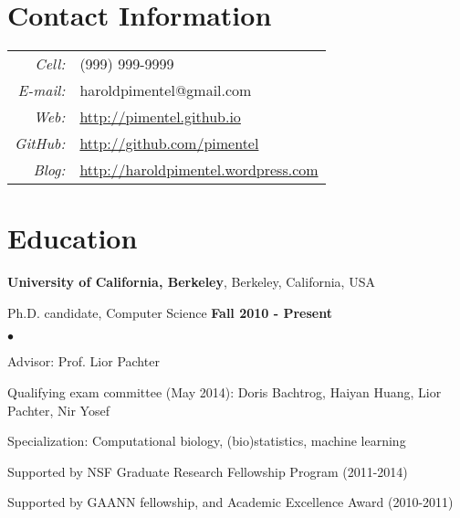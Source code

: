 \documentclass[margin,line]{res}
\newenvironment{list2}{
  \begin{list}{$\bullet$}{%
      \setlength{\itemsep}{0in}
      \setlength{\parsep}{0in} \setlength{\parskip}{0in}
      \setlength{\topsep}{0in} \setlength{\partopsep}{0in}
      \setlength{\leftmargin}{0.2in}}}{\end{list}}
\begin{document}

\begin{resume}

\section{\sc Contact Information}
\vspace{.05in}

\begin{tabular}{r l}
  {\it Cell:}&  {(999) 999-9999} \\
  {\it E-mail:}&  {haroldpimentel@gmail.com} \\
  {\it Web:}& {\url{http://pimentel.github.io}} \\
  {\it GitHub:}& {\url{http://github.com/pimentel}} \\
  {\it Blog:}& {\url{http://haroldpimentel.wordpress.com}} \\
\end{tabular}


\section{\sc Education}
{\bf University of California, Berkeley}, Berkeley, California, USA

\vspace{-.3cm}
Ph.D. candidate, Computer Science \hfill {\bf
 Fall 2010 - Present}\\
\vspace{-.45cm}
\begin{list2}
\vspace*{1mm}
\item Advisor: Prof. Lior Pachter
\item Qualifying exam committee (May 2014): Doris Bachtrog, Haiyan Huang, Lior Pachter, Nir Yosef
\item Specialization: Computational biology, (bio)statistics, machine learning
\item Supported by NSF Graduate Research Fellowship Program (2011-2014)
\item Supported by GAANN fellowship, and Academic Excellence Award (2010-2011)
\end{list2}



\end{resume}
\end{document}
